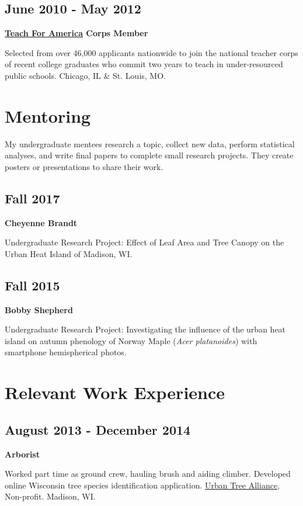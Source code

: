 \documentclass{article}
\begin{document}
\subsection*{June 2010 - May 2012}
\label{sec:org7d6eac3}
\textbf{\href{https://www.teachforamerica.org/}{Teach For America} Corps Member}

Selected from over 46,000 applicants nationwide to join the national
teacher corps of recent college graduates who commit two years to
teach in under-resourced public schools.  Chicago, IL \& St. Louis, MO.

\section*{Mentoring}
\label{sec:org4cdf408}

My undergraduate mentees research a topic, collect new data, perform statistical
analyses, and write final papers to complete small research projects.  They
create posters or presentations to share their work.

\subsection*{Fall 2017}
\label{sec:org102d266}
\textbf{Cheyenne Brandt}

Undergraduate Research Project: Effect of Leaf Area and Tree Canopy on the Urban
Heat Island of Madison, WI.

\subsection*{Fall 2015}
\label{sec:orgd79736d}
\textbf{Bobby Shepherd}

Undergraduate Research Project: Investigating the influence of the
urban heat island on autumn phenology of Norway Maple (\emph{Acer
platanoides}) with smartphone hemispherical photos.
\section*{Relevant Work Experience}
\label{sec:org4f925d3}

\subsection*{August 2013 - December 2014}
\label{sec:org4b98bb5}
\textbf{Arborist}

Worked part time as ground crew, hauling brush and aiding climber.
Developed online Wisconsin tree species identification application.
\href{http://www.urbantreealliance.org/}{Urban Tree Alliance}, Non-profit. Madison, WI.
\end{document}
